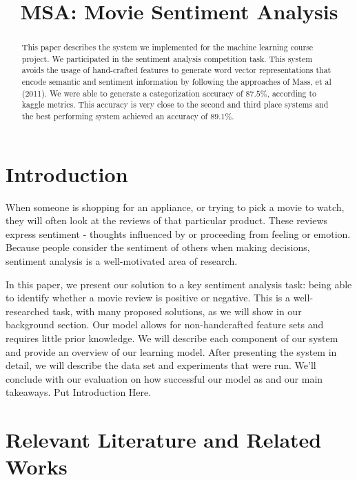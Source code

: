 \documentclass[11pt,letterpaper]{article}
\title{MSA: Movie Sentiment Analysis}
\begin{document}
\maketitle
\begin{abstract}
This paper describes the system we implemented for the machine learning course project. We participated in the sentiment analysis competition task. This system avoids the usage of hand-crafted features to generate word vector representations that encode semantic and sentiment information by following the approaches of Mass, et al (2011). We were able to generate a categorization accuracy of $87.5\%$, according to kaggle metrics. This accuracy is very close to the second and third place systems and the best performing system achieved an accuracy of $89.1\%$.


\end{abstract}

\section{Introduction}

When someone is shopping for an appliance, or trying to pick a movie to watch, they will often look at the reviews of that particular product. These reviews express sentiment - thoughts influenced by or proceeding from feeling or emotion. Because people consider the sentiment of others when making decisions, sentiment analysis is a well-motivated area of research.

In this paper, we present our solution to a key sentiment analysis task: being able to identify whether a movie review is positive or negative. This is a well-researched task, with many proposed solutions, as we will show in our background section. Our model allows for non-handcrafted feature sets and requires little prior knowledge. We will describe each component of our system and provide an overview of our learning model. After presenting the system in detail, we will describe the data set and experiments that were run. We’ll conclude with our evaluation on how successful our model as and our main takeaways.
Put Introduction Here.


\section{Relevant Literature and Related Works}
\end{document}
